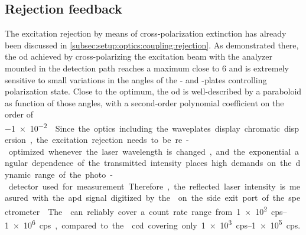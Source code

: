 \subsection{Rejection feedback}\label{subsec:sec:exp:mjolnir:calibration:rejection}
The excitation rejection by means of cross-polarization extinction has already been discussed in \cref{subsec:setup:optics:coupling:rejection}.
As demonstrated there, the \gls{od} achieved by cross-polarizing the excitation beam with the analyzer mounted in the detection path reaches a maximum close to \num{6} and is extremely sensitive to small variations in the angles of the \quarterwave- and \halfwave-plates controlling polarization state.
Close to the optimum, the \gls{od} is well-described by a paraboloid as function of those angles, with a second-order polynomial coefficient on the order of \qty[per-mode = symbol]{-1e-2}{\per\square\txtdegree}.
Since the optics including the waveplates display chromatic dispersion, the excitation rejection needs to be re-optimized whenever the laser wavelength is changed, and the exponential angular dependence of the transmitted intensity places high demands on the dynamic range of the photo-detector used for measurement.
Therefore, the reflected laser intensity is measured with the \gls{apd} signal digitized by the \tagger on the side exit port of the spectrometer.
The \taggershort can reliably cover a count rate range from \qtyrange{1e2}{1e6}{cps}, compared to the \theccd \gls{ccd} covering only \qtyrange{1e3}{1e5}{cps}.

